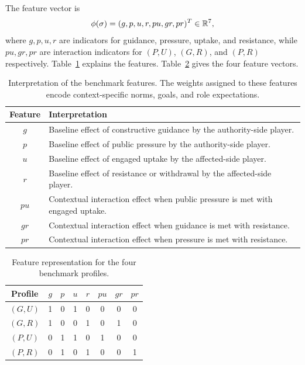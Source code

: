The feature vector is
\[
\phi(\sigma)=(g,p,u,r,pu,gr,pr)^T\in\mathbb{R}^7,
\]
where $g,p,u,r$ are indicators for guidance, pressure, uptake, and resistance, while $pu,gr,pr$ are interaction indicators for $(P,U)$, $(G,R)$, and $(P,R)$ respectively. Table~\ref{tab:feature-meaning} explains the features. Table~\ref{tab:features} gives the four feature vectors.

\begin{table}[t]
\centering
\small
\begin{tabular}{c p{}}
\toprule
Feature & Interpretation\\
\midrule
$g$ & Baseline effect of constructive guidance by the authority-side player.\\
$p$ & Baseline effect of public pressure by the authority-side player.\\
$u$ & Baseline effect of engaged uptake by the affected-side player.\\
$r$ & Baseline effect of resistance or withdrawal by the affected-side player.\\
$pu$ & Contextual interaction effect when public pressure is met with engaged uptake.\\
$gr$ & Contextual interaction effect when guidance is met with resistance.\\
$pr$ & Contextual interaction effect when pressure is met with resistance.\\
\bottomrule
\end{tabular}
\caption{Interpretation of the benchmark features. The weights assigned to these features encode context-specific norms, goals, and role expectations.}
\label{tab:feature-meaning}
\end{table}

\begin{table}[t]
\centering
\small
\begin{tabular}{cccccccc}
\toprule
Profile & $g$ & $p$ & $u$ & $r$ & $pu$ & $gr$ & $pr$\\
\midrule
$(G,U)$ & 1 & 0 & 1 & 0 & 0 & 0 & 0\\
$(G,R)$ & 1 & 0 & 0 & 1 & 0 & 1 & 0\\
$(P,U)$ & 0 & 1 & 1 & 0 & 1 & 0 & 0\\
$(P,R)$ & 0 & 1 & 0 & 1 & 0 & 0 & 1\\
\bottomrule
\end{tabular}
\caption{Feature representation for the four benchmark profiles.}
\label{tab:features}
\end{table}

